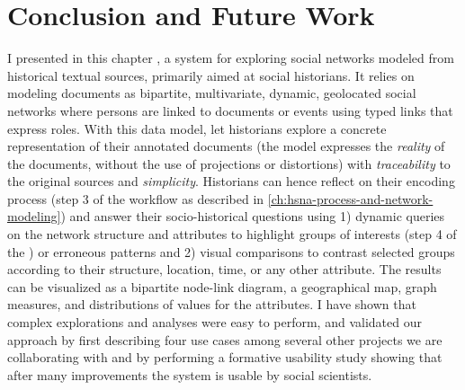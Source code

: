 \section{Conclusion and Future Work}

I presented in this chapter \name, a \va system for exploring social networks modeled from historical textual sources, primarily aimed at social historians.
It relies on modeling documents as bipartite, multivariate, dynamic, geolocated social networks where persons are linked to documents or events using typed links that express roles.
With this data model, \name let historians explore a concrete representation of their annotated documents (\ie the model expresses the \emph{reality} of the documents, without the use of projections or distortions) with \emph{traceability} to the original sources and \emph{simplicity}.
Historians can hence reflect on their encoding process (step 3 of the \hsna workflow as described in \autoref{ch:hsna-process-and-network-modeling}) and answer their socio-historical questions using 1) dynamic queries on the network structure and attributes to highlight groups of interests (step 4 of the \hsna) or erroneous patterns and 2) visual comparisons to contrast selected groups according to their structure, location, time, or any other attribute.
The results can be visualized as a bipartite node-link diagram, a geographical map, graph measures, and distributions of values for the attributes.
I have shown that complex explorations and analyses were easy to perform, and validated our approach by first describing four use cases among several other projects we are collaborating with and by performing a formative usability study showing that after many improvements the system is usable by social scientists.

